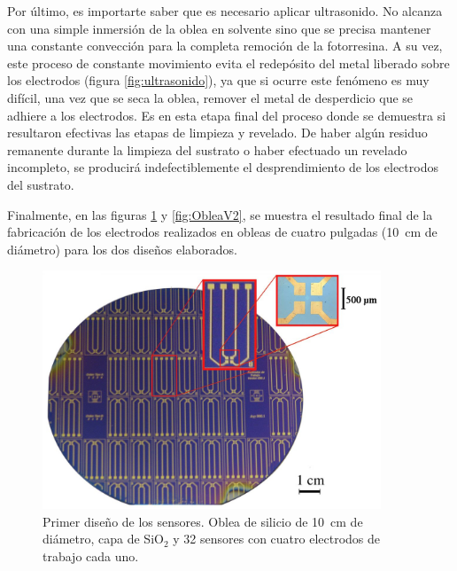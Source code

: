 {		 Por último, es importarte saber que es necesario aplicar ultrasonido. No alcanza con una simple inmersión de la oblea en solvente sino que se precisa mantener una constante convección para la completa remoción de la fotorresina. A su vez, este proceso de constante movimiento evita el redepósito del metal liberado sobre los electrodos (figura \ref{fig:ultrasonido}), ya que si ocurre este fenómeno es muy difícil, una vez que se seca la oblea, remover el metal de desperdicio que se adhiere a los electrodos. Es en esta etapa final del proceso donde se demuestra si resultaron efectivas las etapas de limpieza y revelado. De haber algún residuo remanente durante la limpieza del sustrato o haber efectuado un revelado incompleto, se producirá indefectiblemente el desprendimiento de los electrodos del sustrato.

		 Finalmente, en las figuras \ref{fig:ObleaV1} y \ref{fig:ObleaV2}, se muestra el resultado final de la fabricación de los electrodos realizados en obleas de cuatro pulgadas (\SI{10}{\cm} de diámetro) para los dos diseños elaborados.

		 			  \clearpage
					  \begin{figure}[ht!]
					  \begin{center}
					  \includegraphics[width=0.90\textwidth]{Imagenes/ObleaV1.jpg}
					  \caption[Electrodos, primera versión]{Primer diseño de los sensores. Oblea de silicio de \SI{10}{cm} de diámetro, capa de SiO$_2$ y 32 sensores con cuatro electrodos de trabajo cada uno.}
					  \label{fig:ObleaV1}
					  \end{center}
					  \end{figure} 	

}
